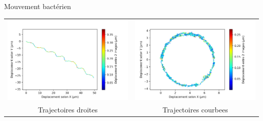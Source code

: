 \documentclass[11pt]{beamer}
\begin{document}
\begin{frame}{Mouvement bactérien}
\begin{center}
\begin{tabular}{cc}
    \includegraphics[scale=0.3]{Trajectory_bac_4} & \includegraphics[scale=0.3]{Trajectory_bac_5} \\
    Trajectoires droites & Trajectoires courbees
    \end{tabular}
    \end{center}
\end{frame}
\end{document}
